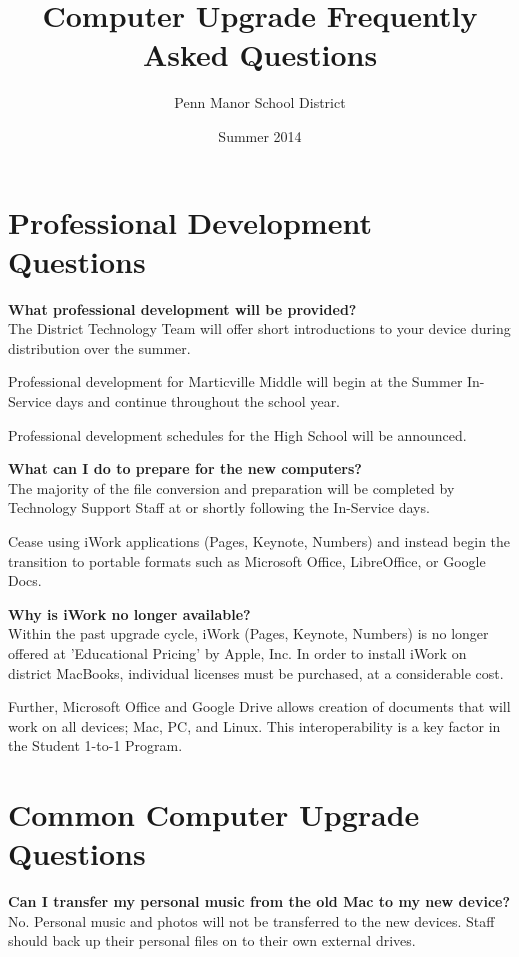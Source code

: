 \documentclass[10pt,foldmark,notumble]{leaflet}
\title{Computer Upgrade Frequently Asked Questions}
\author{Penn Manor School District}
\date{Summer 2014}
\begin{document}
\maketitle
\thispagestyle{empty}
\section{Professional Development Questions\color{red}\hrulefill\color{black}}
\textbf{What professional development will be provided?}\\
The District Technology Team will offer short introductions to your device during distribution over the summer.

Professional development for Marticville Middle will begin at the Summer In-Service days and continue throughout the school year.

Professional development schedules for the High School will be announced.

\textbf{What can I do to prepare for the new computers?}\\
The majority of the file conversion and preparation will be completed by Technology Support Staff at or shortly following the In-Service days.

Cease using iWork applications (Pages, Keynote, Numbers) and instead begin the transition to portable formats such as Microsoft Office, LibreOffice, or Google Docs.

\textbf{Why is iWork no longer available?}\\
Within the past upgrade cycle, iWork (Pages, Keynote, Numbers) is no longer offered at 'Educational Pricing' by Apple, Inc.
In order to install iWork on district MacBooks, individual licenses must be purchased, at a considerable cost.


Further, Microsoft Office and Google Drive allows creation of documents that will work on all devices; Mac, PC, and Linux.
This interoperability is a key factor in the Student 1-to-1 Program.

\section{Common Computer Upgrade Questions\color{red}\hrulefill\color{black}}
\textbf{Can I transfer my personal music from the old Mac to my new device?}\\
No. Personal music and photos will not be transferred to the new devices. Staff should back up their personal files on to their own external drives.
\end{document}

